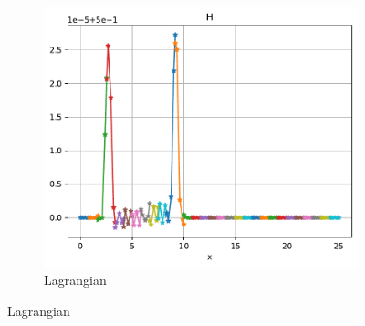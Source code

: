 \documentclass[pt12]{beamer}
\begin{document}
\begin{frame}
\begin{figure}
\begin{subfigure}[b]{0.3\textwidth}
     \end{subfigure}
     \begin{subfigure}[b]{0.3\textwidth}
         \centering
         \includegraphics[width=\textwidth]{figures/lakeatrest/lagr.pdf}
     \caption{Lagrangian}
     \end{subfigure}
\end{figure}


\end{frame}
\end{document}
